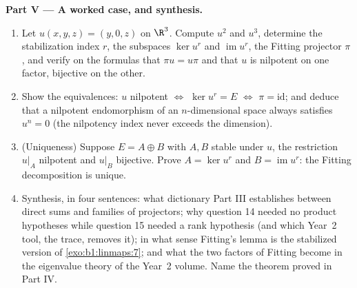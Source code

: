 \begin{problem}
\medskip
\noindent\textbf{Part V --- A worked case, and synthesis.}
\begin{enumerate}[resume]
  \item Let $u(x, y, z) = (y, 0, z)$ on $\R^3$. Compute $u^2$ and
        $u^3$, determine the stabilization index $r$, the
        subspaces $\ker u^{r}$ and $\operatorname{im} u^{r}$, the
        Fitting projector $\pi$, and verify on the formulas that
        $\pi u = u\pi$ and that $u$ is nilpotent on one factor,
        bijective on the other.
  \item Show the equivalences: $u$ nilpotent $\iff$ $\ker u^{r} =
        E$ $\iff$ $\pi = \mathrm{id}$; and deduce that a
        nilpotent endomorphism of an $n$-dimensional space
        always satisfies $u^{n} = 0$ (the nilpotency index never
        exceeds the dimension).
  \item (Uniqueness) Suppose $E = A \oplus B$ with $A, B$ stable
        under $u$, the restriction $u|_A$ nilpotent and $u|_B$
        bijective. Prove $A = \ker u^{r}$ and $B =
        \operatorname{im} u^{r}$: the Fitting decomposition is
        unique.
  \item Synthesis, in four sentences: what dictionary Part III
        establishes between direct sums and families of
        projectors; why question 14 needed no product
        hypotheses while question 15 needed a rank hypothesis
        (and which Year~2 tool, the trace, removes it); in what
        sense Fitting's lemma is the stabilized version of
        \cref{exo:b1:linmaps:7}; and what the two factors of
        Fitting become in the eigenvalue theory of the Year~2
        volume. Name the theorem proved in Part IV.
\end{enumerate}
\end{problem}
